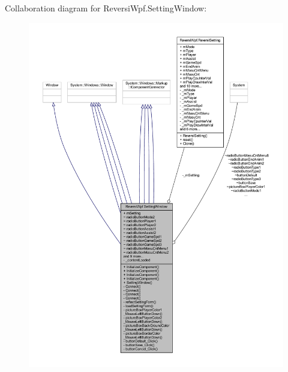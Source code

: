 Collaboration diagram for Reversi\+Wpf.\+Setting\+Window\+:
\nopagebreak
\begin{figure}[H]
\begin{center}
\leavevmode
\includegraphics[width=350pt]{class_reversi_wpf_1_1_setting_window__coll__graph}
\end{center}
\end{figure}
